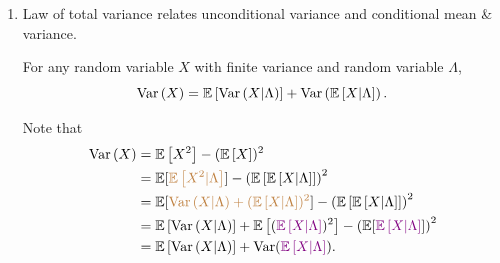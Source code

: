 \begin{enumerate}
\begin{pf}
Firstly, note that \(h(\lambda)=\expv{\indicset{X\le
x}|\Lambda=\lambda}=F_{X|\Lambda}(x|\lambda)\). Thus,
\[
F_X(x)=\expv{h(\Lambda)}=\int_{-\infty}^{\infty}h(\lambda)f_{\Lambda}(\lambda)\dd{\lambda}
=\int_{-\infty}^{\infty}F_{X|\Lambda}(x|\lambda)f_{\Lambda}(\lambda)\dd{\lambda}.
\]
\end{pf}
\item Law of total variance relates unconditional variance and conditional mean
\& variance.
\begin{proposition}
\label{thm:lotv}
For any random variable \(X\) with finite variance and random variable
\(\Lambda\),
\[
\operatorname{Var}\left(X\right)=\mathbb{E}\left[\operatorname{Var}\left(X|\Lambda\right)\right]+\operatorname{Var}\left(\mathbb{E}\left[X|\Lambda\right]\right).
\]
\end{proposition}
\begin{pf}
Note that
\begin{align*}
\operatorname{Var}\left(X\right)&=\mathbb{E}\left[X^2\right]-(\mathbb{E}\left[X\right])^{2}\\
&=\mathbb{E}[{\color{brown}\mathbb{E}\left[X^2|\Lambda\right]}]-\qty(\mathbb{E}\left[\mathbb{E}\left[X|\Lambda\right]\right])^{2}\\
&=\mathbb{E}[{\color{brown}\operatorname{Var}\left(X|\Lambda\right)+(\mathbb{E}\left[X|\Lambda\right])^{2}}]-\qty(\mathbb{E}\left[\mathbb{E}\left[X|\Lambda\right]\right])^{2}\\
&=\mathbb{E}\left[\operatorname{Var}\left(X|\Lambda\right)\right]+\mathbb{E}\left[({\color{violet}\mathbb{E}\left[X|\Lambda\right]})^{2}\right]
-\qty(\mathbb{E}[{\color{violet}\mathbb{E}\left[X|\Lambda\right]}])^{2}\\
&=\mathbb{E}\left[\operatorname{Var}\left(X|\Lambda\right)\right]+\operatorname{Var}({\color{violet}\mathbb{E}\left[X|\Lambda\right]}).
\end{align*}
\end{pf}
\end{enumerate}

